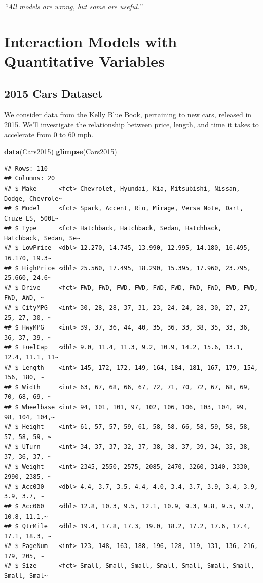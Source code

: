 \documentclass[]{book}
\newenvironment{Shaded}{\begin{snugshade}}{\end{snugshade}}
\newcommand{\KeywordTok}[1]{\textcolor[rgb]{0.13,0.29,0.53}{\textbf{#1}}}
\newcommand{\NormalTok}[1]{#1}
\begin{document}
\emph{``All models are wrong, but some are useful.''}

\section{Interaction Models with Quantitative
Variables}\label{interaction-models-with-quantitative-variables}

\subsection{2015 Cars Dataset}\label{cars-dataset}

We consider data from the Kelly Blue Book, pertaining to new cars,
released in 2015. We'll investigate the relationship between price,
length, and time it takes to accelerate from 0 to 60 mph.

\begin{Shaded}
\begin{Highlighting}[]
\KeywordTok{data}\NormalTok{(Cars2015)}
\KeywordTok{glimpse}\NormalTok{(Cars2015)}
\end{Highlighting}
\end{Shaded}

\begin{verbatim}
## Rows: 110
## Columns: 20
## $ Make      <fct> Chevrolet, Hyundai, Kia, Mitsubishi, Nissan, Dodge, Chevrole~
## $ Model     <fct> Spark, Accent, Rio, Mirage, Versa Note, Dart, Cruze LS, 500L~
## $ Type      <fct> Hatchback, Hatchback, Sedan, Hatchback, Hatchback, Sedan, Se~
## $ LowPrice  <dbl> 12.270, 14.745, 13.990, 12.995, 14.180, 16.495, 16.170, 19.3~
## $ HighPrice <dbl> 25.560, 17.495, 18.290, 15.395, 17.960, 23.795, 25.660, 24.6~
## $ Drive     <fct> FWD, FWD, FWD, FWD, FWD, FWD, FWD, FWD, FWD, FWD, FWD, AWD, ~
## $ CityMPG   <int> 30, 28, 28, 37, 31, 23, 24, 24, 28, 30, 27, 27, 25, 27, 30, ~
## $ HwyMPG    <int> 39, 37, 36, 44, 40, 35, 36, 33, 38, 35, 33, 36, 36, 37, 39, ~
## $ FuelCap   <dbl> 9.0, 11.4, 11.3, 9.2, 10.9, 14.2, 15.6, 13.1, 12.4, 11.1, 11~
## $ Length    <int> 145, 172, 172, 149, 164, 184, 181, 167, 179, 154, 156, 180, ~
## $ Width     <int> 63, 67, 68, 66, 67, 72, 71, 70, 72, 67, 68, 69, 70, 68, 69, ~
## $ Wheelbase <int> 94, 101, 101, 97, 102, 106, 106, 103, 104, 99, 98, 104, 104,~
## $ Height    <int> 61, 57, 57, 59, 61, 58, 58, 66, 58, 59, 58, 58, 57, 58, 59, ~
## $ UTurn     <int> 34, 37, 37, 32, 37, 38, 38, 37, 39, 34, 35, 38, 37, 36, 37, ~
## $ Weight    <int> 2345, 2550, 2575, 2085, 2470, 3260, 3140, 3330, 2990, 2385, ~
## $ Acc030    <dbl> 4.4, 3.7, 3.5, 4.4, 4.0, 3.4, 3.7, 3.9, 3.4, 3.9, 3.9, 3.7, ~
## $ Acc060    <dbl> 12.8, 10.3, 9.5, 12.1, 10.9, 9.3, 9.8, 9.5, 9.2, 10.8, 11.1,~
## $ QtrMile   <dbl> 19.4, 17.8, 17.3, 19.0, 18.2, 17.2, 17.6, 17.4, 17.1, 18.3, ~
## $ PageNum   <int> 123, 148, 163, 188, 196, 128, 119, 131, 136, 216, 179, 205, ~
## $ Size      <fct> Small, Small, Small, Small, Small, Small, Small, Small, Smal~
\end{verbatim}
\end{document}
